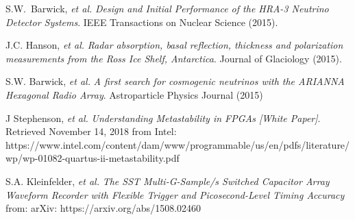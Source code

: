 \documentclass[journal]{IEEEtran}
\begin{document}
%
%
%
\begin{thebibliography}{1}

S.W.~Barwick, \emph{et al.} \emph{Design and Initial Performance of the HRA-3 Neutrino Detector Systems}. IEEE Transactions on Nuclear Science (2015).

J.C. Hanson, \emph{et al.} \emph{Radar absorption, basal reflection, thickness and polarization measurements from the Ross Ice Shelf, Antarctica}. Journal of Glaciology (2015).

S.W. Barwick, \emph{et al.} \emph{A first search for cosmogenic neutrinos with the ARIANNA Hexagonal Radio Array}. Astroparticle Physics Journal (2015)

J Stephenson, \emph{et al.} \emph{Understanding Metastability in FPGAs [White Paper]}. Retrieved November 14, 2018 from Intel: https://www.intel.com/content/dam/www/programmable/us/en/pdfs/literature/wp/wp-01082-quartus-ii-metastability.pdf

S.A. Kleinfelder, \emph{et al.} \emph{The SST Multi-G-Sample/s Switched Capacitor Array Waveform Recorder with Flexible Trigger and Picosecond-Level Timing Accuracy} from:
arXiv:
https://arxiv.org/abs/1508.02460

\end{thebibliography}

% 
\end{document}
